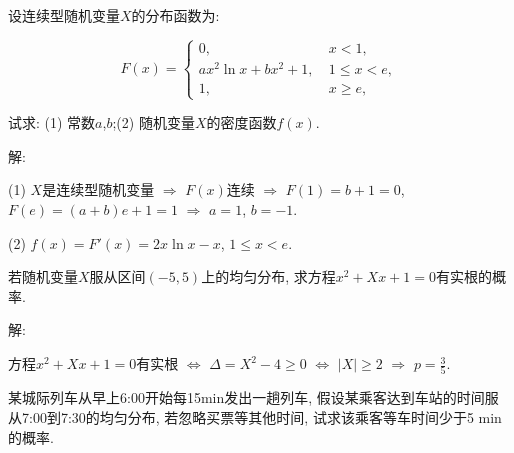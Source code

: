 \documentclass[standard]{ExBook}
\begin{document}
\begin{qitems}
\vspace{-5em}

    \begin{bbox}
    \begin{shaded}
        \qitem
设连续型随机变量$X$的分布函数为:
\vspace{-2em}
\begin{center}
\begin{equation}
    F(x)=
    \left\{
    \begin{array}{cl}
        \nonumber
        0,\ &x < 1,\\
        ax^2\ln x+bx^2+1,\ &1 \leq x < e,\\
        1,\ &x \geq e,
    \end{array}
    \right.
\end{equation}
\end{center}
试求: (1) 常数$a$,$b$;\qquad(2) 随机变量$X$的密度函数$f(x)$.
    \end{shaded}
    \end{bbox}

\vspace{-5em}

    \begin{bbox}
解: 

(1) $X$是连续型随机变量 $\Longrightarrow$ $F(x)$连续 $\Longrightarrow$ $F(1)=b+1=0$, $F(e)=(a+b)e+1=1$ $\Longrightarrow$ $a=1$, $b=-1$.

(2) $f(x)=F'(x)=2x\ln x-x$, $1 \leq x < e$.
    \end{bbox}

\vspace{-5em}

    \begin{bbox}
    \begin{shaded}
        \qitem
若随机变量$X$服从区间$(-5,5)$上的均匀分布, 求方程$x^2+Xx+1=0$有实根的概率.
    \end{shaded}
    \end{bbox}

\vspace{-5em}

    \begin{bbox}
解: 

方程$x^2+Xx+1=0$有实根 $\Longleftrightarrow$ $\Delta=X^2-4\geq0$ $\Longleftrightarrow$ $|X|\geq 2$ $\Longrightarrow$ $p=\displaystyle\frac{3}{5}$.
    \end{bbox}

\vspace{-5em}

    \begin{bbox}
    \begin{shaded}
        \qitem
某城际列车从早上6:00开始每15min发出一趟列车, 假设某乘客达到车站的时间服从7:00到7:30的均匀分布, 若忽略买票等其他时间, 试求该乘客等车时间少于5 min的概率.
    \end{shaded}
    \end{bbox}


\end{qitems}
\end{document}
